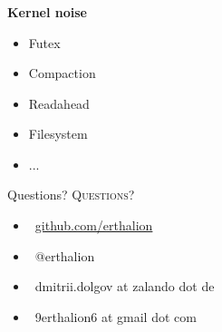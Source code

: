\documentclass[usenames,dvipsnames, 18pt, compress, aspectratio=169]{beamer}
\def\twitter{{\FA \faTwitter}}
\def\github{{\FA \faGithub}}
\def\email{{\FA \faEnvelope}}
\begin{document}
\begin{frame}[fragile]{}
    \frametitle{}
    \begin{center}
        \textbf{Kernel noise}

        \begin{itemize}[]
			\item Futex
            \item Compaction
            \item Readahead
            \item Filesystem
            \item ...
        \end{itemize}

    \end{center}
\end{frame}

\fontsize{18pt}{18}\selectfont
\begin{frame}
  \vspace*{2.5cm}
  \begin{minipage}[b][\paperheight]{\textwidth}
  \begin{center}

      \linespread{1.0}%
      \if@noSmallCapitals%
        Questions?
      \else%
        \scshape{\color{black} Questions?}%
      \fi%
      \vspace*{0.3em}

      \fontsize{13pt}{14}\selectfont
        \begin{itemize}[label={}]
            \item {\color{black} \github\ \href{github.com/erthalion}
                                               {\color{black}github.com/erthalion}}
            \item {\color{black} \twitter\ @erthalion}
            \item {\color{black} \email\ dmitrii.dolgov at zalando dot de}
            \item {\color{black} \email\ 9erthalion6 at gmail dot com}
        \end{itemize}
      \vspace*{2.5em}%

    \vfill
    \vspace*{2em}
  \end{center}
  \end{minipage}

\end{frame}
\end{document}
